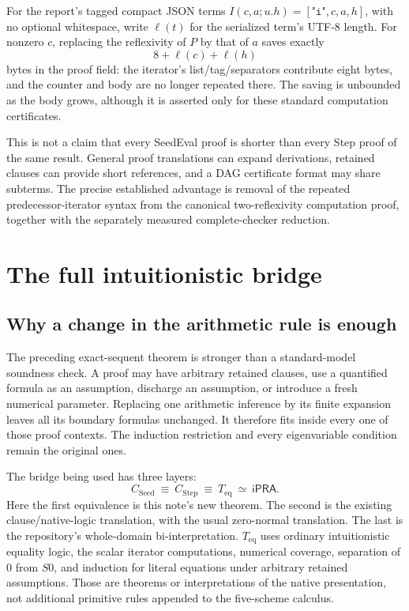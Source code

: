 \documentclass[11pt,letterpaper]{article}
\newcommand{\ipra}{\mathsf{iPRA}}
\begin{document}
For the report's tagged compact JSON terms
$I(c,a;u.h)=[\texttt{"i"},c,a,h]$, with no optional whitespace,
write $\ell(t)$ for the serialized term's UTF-8 length.  For nonzero
$c$, replacing the reflexivity of $P$ by that of $a$ saves exactly
\[
                         8+\ell(c)+\ell(h)
\]
bytes in the proof field: the iterator's list/tag/separators contribute
eight bytes, and the counter and body are no longer repeated there.
The saving is unbounded as the body grows, although it is asserted
only for these standard computation certificates.

This is not a claim that every SeedEval proof is shorter than every Step
proof of the same result.  General proof translations can expand
derivations, retained clauses can provide short references, and a DAG
certificate format may share subterms.  The precise established
advantage is removal of the repeated predecessor-iterator syntax from
the canonical two-reflexivity computation proof, together with the
separately measured complete-checker reduction.

\section{The full intuitionistic bridge}

\subsection{Why a change in the arithmetic rule is enough}

The preceding exact-sequent theorem is stronger than a standard-model
soundness check. A proof may have arbitrary retained clauses, use a
quantified formula as an assumption, discharge an assumption, or introduce
a fresh numerical parameter. Replacing one arithmetic inference by its
finite expansion leaves all its boundary formulas unchanged. It therefore
fits inside every one of those proof contexts. The induction restriction
and every eigenvariable condition remain the original ones.

The bridge being used has three layers:
\[
 C_{\mathrm{Seed}}\ \equiv\ C_{\mathrm{Step}}
 \ \equiv\ T_{\mathrm{eq}}\ \simeq\ \ipra.
\]
Here the first equivalence is this note's new theorem. The second is the
existing clause/native-logic translation, with the usual zero-normal
translation. The last is the repository's whole-domain bi-interpretation.
$T_{\mathrm{eq}}$ uses ordinary intuitionistic equality logic, the scalar
iterator computations, numerical coverage, separation of $0$ from $S0$,
and induction for literal equations under arbitrary retained assumptions.
Those are theorems or interpretations of the native presentation, not
additional primitive rules appended to the five-scheme calculus.
\end{document}
